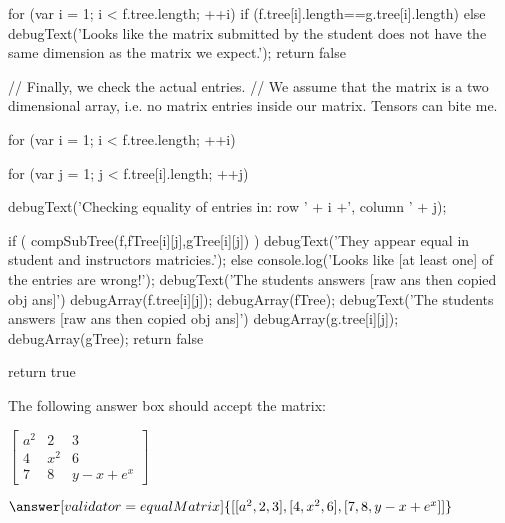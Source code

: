 \documentclass{ximera}
\begin{document}
\begin{javascript}
{    for (var i = 1; i < f.tree.length; ++i) {
        if (f.tree[i].length==g.tree[i].length) {
        } else {
            debugText('Looks like the matrix submitted by the student does not have the same dimension as the matrix we expect.');
            return false
        }
    }
    
    // Finally, we check the actual entries. 
    // We assume that the matrix is a two dimensional array, i.e. no matrix entries inside our matrix. Tensors can bite me.
    
    for (var i = 1; i < f.tree.length; ++i) {
        for (var j = 1; j < f.tree[i].length; ++j) {
            debugText('Checking equality of entries in: row ' + i +', column ' + j);
            
            if ( compSubTree(f,fTree[i][j],gTree[i][j]) ) {
                debugText('They appear equal in student and instructors matricies.');
            } else {
                console.log('Looks like [at least one] of the entries are wrong!');
                debugText('The students answers [raw ans then copied obj ans]')
                debugArray(f.tree[i][j]);
                debugArray(fTree);
                debugText('The students answers [raw ans then copied obj ans]')
                debugArray(g.tree[i][j]);
                debugArray(gTree);
                return false
            }
        }
    }
    
return true
}


\end{javascript}

\begin{problem}

The following answer box should accept the matrix:

$\left[\begin{matrix}
a^2 & 2 & 3 \\
4 & x^2 & 6 \\
7 & 8 & y-x+e^x
\end{matrix}\right]$

$\answer[validator=equalMatrix]{[ [a^2,2,3], [4,x^2,6], [7,8,y-x+e^x] ]}$
    
\end{problem}
\end{document}
